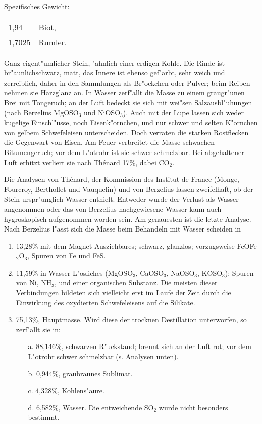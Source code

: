 \documentclass[a4paper, 11pt, oneside]{article}
\begin{document}
Spezifisches Gewicht:
\begin{table}[!ht]
    \centering\swabfamily\Large
    \begin{tabular}{l l}
        1,94 & Biot,\\
        1,7025 & Rumler.
    \end{tabular}
\end{table}

Ganz eigent"umlicher Stein, "ahnlich einer erdigen Kohle. Die Rinde ist br"aunlichschwarz, matt, das Innere ist ebenso gef"arbt, sehr weich und zerreiblich, daher in den Sammlungen als Br"ockchen oder Pulver; beim Reiben nehmen sie Harzglanz an. In Wasser zerf"allt die Masse zu einem graugr"unen Brei mit Tongeruch; an der Luft bedeckt sie sich mit wei"sen Salzausbl"uhungen (nach Berzelius MgOSO$_{3}$ und NiOSO$_{3}$). Auch mit der Lupe lassen sich weder kugelige Einschl"usse, noch Eisenk"ornchen, und nur schwer und selten K"ornchen von gelbem Schwefeleisen unterscheiden. Doch verraten die starken Rostflecken die Gegenwart von Eisen. Am Feuer verbreitet die Masse schwachen Bitumengeruch; vor dem L"otrohr ist sie schwer schmelzbar. Bei abgehaltener Luft erhitzt verliert sie nach Thénard 17\%, dabei CO$_{2}$.

Die Analysen von Thénard, der Kommission des Institut de France (Monge, Fourcroy, Berthollet und Vauquelin) und von Berzelius lassen zweifelhaft, ob der Stein urspr"unglich Wasser enthielt. Entweder wurde der Verlust als Wasser angenommen oder das von Berzelius nachgewiesene Wasser kann auch hygroskopisch aufgenommen worden sein. Am genauesten ist die letzte Analyse. Nach Berzelius l"asst sich die Masse beim Behandeln mit Wasser scheiden in
\begin{enumerate}
    \item 13,28\% mit dem Magnet Ausziehbares; schwarz, glanzlos; vorzugsweise FeOFe$_{2}$O$_{3}$, Spuren von Fe und FeS.
    \item 11,59\% in Wasser L"osliches (MgOSO$_{3}$, CaOSO$_{3}$, NaOSO$_{3}$, KOSO$_{3}$); Spuren von Ni, NH$_{3}$, und einer organischen Substanz. Die meisten dieser Verbindungen bildeten sich vielleicht erst im Laufe der Zeit durch die Einwirkung des oxydierten Schwefeleisens auf die Silikate.
    \item 75,13\%, Hauptmasse. Wird diese der trocknen Destillation unterworfen, so zerf"allt sie in:
    \begin{itemize}
        \item[a.] 88,146\%, schwarzen R"uckstand; brennt sich an der Luft rot; vor dem L"otrohr schwer schmelzbar (s. Analysen unten).
        \item[b.] 0,944\%, graubraunes Sublimat.
        \item[c.] 4,328\%, Kohlens"aure.
        \item[d.] 6,582\%, Wasser. Die entweichende SO$_{2}$ wurde nicht besonders bestimmt.
    \end{itemize}
\end{enumerate}
\end{document}
